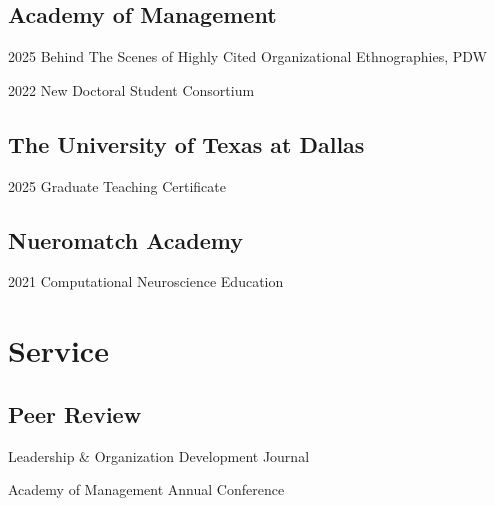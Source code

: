 \documentclass[12pt,letterpaper]{report} %
\newcommand{\listitemspace}{0.2em}
\renewenvironment{itemize}
{\begin{list}{}{\setlength{\leftmargin}{0em}
                \setlength{\parskip}{0em}
                \setlength{\itemsep}{\listitemspace}
                \setlength{\parsep}{\listitemspace}}}
{\end{list}}
\begin{document}
    \subsection*{Academy of Management}

    \begin{tablist}
        \item[2025]\tab{}Behind The Scenes of Highly Cited Organizational Ethnographies, PDW
        \item[2022]\tab{}New Doctoral Student Consortium
        
    \end{tablist}


    \subsection*{The University of Texas at Dallas}

    \begin{tablist}

        \item[2025]\tab{}Graduate Teaching Certificate

    \end{tablist}


    \subsection*{Nueromatch Academy}

    \begin{tablist}
        \item[2021]\tab{}Computational Neuroscience Education
        
    \end{tablist}
    \section*{Service}


    \subsection*{Peer Review}

    \begin{itemize}

        \item Leadership \& Organization Development Journal
        
        \item Academy of Management Annual Conference
        
    \end{itemize}
\end{document}
